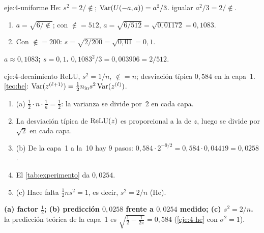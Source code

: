 \begin{solucion}{eje:4-uniforme}
\datos He: $s^{2}=2/\nin$; $\operatorname{Var}(U(-a,a))=a^{2}/3$.
\planteamiento igualar $a^{2}/3=2/\nin$.
\pasos
\begin{enumerate}[label=\arabic*.]
  \item $a=\sqrt{6/\nin}$; con $\nin=512$, $a=\sqrt{6/512}=\sqrt{0{,}01172}=0{,}1083$.
  \item Con $\nin=200$: $s=\sqrt{2/200}=\sqrt{0{,}01}=0{,}1$.
\end{enumerate}
\resultado \textbf{$a\approx 0{,}1083$; $s=0{,}1$.}
\comprobacion $0{,}1083^{2}/3=0{,}003906=2/512$.
\end{solucion}

\begin{solucion}{eje:4-decaimiento}
\datos ReLU, $s^{2}=1/n$, $\nin=n$; desviación típica $0{,}584$ en la capa~1.
\planteamiento \cref{teo:he}: $\operatorname{Var}(z^{(\ell+1)})=\tfrac12n_{\mathrm{in}} s^{2}\operatorname{Var}(z^{(\ell)})$.
\pasos
\begin{enumerate}[label=\arabic*.]
  \item (a) $\tfrac12\cdot n\cdot\tfrac1n=\tfrac12$: la varianza se divide por~2 en cada capa.
  \item La desviación típica de $\operatorname{ReLU}(z)$ es proporcional a la de $z$, luego se divide por $\sqrt2$ en cada capa.
  \item (b) De la capa~1 a la~10 hay 9 pasos: $0{,}584\cdot 2^{-9/2}=0{,}584\cdot 0{,}04419=0{,}0258$.
  \item El \cref{tab:experimento} da $0{,}0254$.
  \item (c) Hace falta $\tfrac12 ns^{2}=1$, es decir, $s^{2}=2/n$ (He).
\end{enumerate}
\resultado \textbf{(a) factor $\tfrac12$; (b) predicción $0{,}0258$ frente a $0{,}0254$ medido; (c) $s^{2}=2/n$.}
\comprobacion la predicción teórica de la capa~1 es $\sqrt{\tfrac12-\tfrac1{2\pi}}=0{,}584$ (\cref{eje:4-he} con $\sigma^{2}=1$).
\end{solucion}

